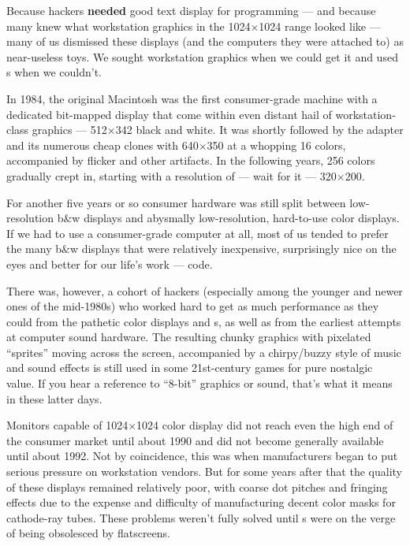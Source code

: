 Because hackers {\bf needed} good text display for programming --- and because many
knew what workstation graphics in the 1024$\times$1024 range looked like --- many of us
dismissed these displays (and the computers they were attached to) as
near-useless toys. We sought workstation graphics when we could get it and used
s when we couldn't.

In 1984, the original Macintosh was the first consumer-grade machine with a
dedicated bit-mapped display that come within even distant hail of
workstation-class graphics --- 512$\times$342 black and white. It was shortly followed
by the  adapter and its numerous cheap clones with 640$\times$350 at a whopping
16 colors, accompanied by flicker and other artifacts. In the following years,
256 colors gradually crept in, starting with a resolution of --- wait for it --- 
320$\times$200.

For another five years or so consumer hardware was still split between
low-resolution b\&w displays and abysmally low-resolution, hard-to-use color
displays. If we had to use a consumer-grade computer at all, most of us tended
to prefer the many b\&w displays that were relatively inexpensive, surprisingly
nice on the eyes and better for our life's work --- code.

There was, however, a cohort of hackers (especially among the younger and newer
ones of the mid-1980s) who worked hard to get as much performance as they could
from the pathetic color displays and s, as well as from the earliest attempts
at computer sound hardware. The resulting chunky graphics with pixelated
``sprites'' moving across the screen, accompanied by a chirpy/buzzy style of
music and sound effects is still used in some 21st-century games for pure
nostalgic value. If you hear a reference to ``8-bit'' graphics or sound, that's
what it means in these latter days.

Monitors capable of 1024$\times$1024 color display did not reach even the high end of
the consumer market until about 1990 and did not become generally available
until about 1992. Not by coincidence, this was when  manufacturers began to
put serious pressure on workstation vendors. But for some years after that the
quality of these displays remained relatively poor, with coarse dot pitches and
fringing effects due to the expense and difficulty of manufacturing decent
color masks for cathode-ray tubes. These problems weren't fully solved until
s were on the verge of being obsolesced by flatscreens.

